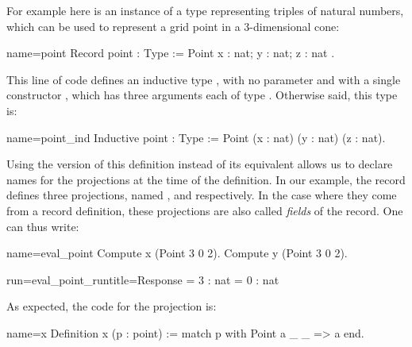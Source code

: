 For example here is an instance of a type representing triples of
natural numbers, which can be used to represent a grid point in a
3-dimensional cone:

\begin{coq}{name=point}{}
Record point : Type := Point { x : nat; y : nat; z : nat }.
\end{coq}
This line of code defines an inductive type , with no
parameter and with a single constructor , which has three
arguments each of type . Otherwise said, this type is:

\begin{coq}{name=point_ind}{}
Inductive point : Type := Point (x : nat) (y : nat) (z : nat).
\end{coq}

Using the  version of this definition instead of its
equivalent  allows us to declare names for the projections
at the time of the definition. In our example, the record 
defines three projections, named ,  and 
respectively. In the case where they come from a record definition,
these projections are also called \emph{fields} of the record.
One can thus write:

\begin{coq-left}{name=eval_point}{}
Compute x (Point 3 0 2).
Compute y (Point 3 0 2).
\end{coq-left}{}{}
\begin{coqout-right}{run=eval_point_run}{title=Response}
= 3 : nat
= 0 : nat
\end{coqout-right}{}{}


As expected, the code for the  projection is:

\begin{coq}{name=x}{}
Definition x (p : point) := match p with Point a _ _ => a end.
\end{coq}

